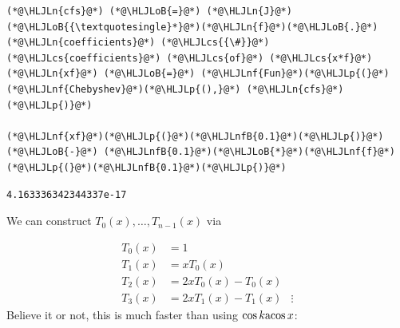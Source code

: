 \documentclass[12pt,a4paper]{article}
\newcommand{\HLJLn}[1]{#1}
\newcommand{\HLJLnf}[1]{\textcolor[RGB]{66,102,213}{#1}}
\newcommand{\HLJLnfB}[1]{\textcolor[RGB]{59,151,46}{#1}}
\newcommand{\HLJLoB}[1]{\textcolor[RGB]{102,102,102}{\textbf{#1}}}
\newcommand{\HLJLp}[1]{#1}
\newcommand{\HLJLcs}[1]{\textcolor[RGB]{153,153,119}{\textit{#1}}}
\def\acos{ {\rm acos}\, }
\begin{document}
\begin{lstlisting}
(*@\HLJLn{cfs}@*) (*@\HLJLoB{=}@*) (*@\HLJLn{J}@*)(*@\HLJLoB{{\textquotesingle}*}@*)(*@\HLJLn{f}@*)(*@\HLJLoB{.}@*)(*@\HLJLn{coefficients}@*) (*@\HLJLcs{{\#}}@*) (*@\HLJLcs{coefficients}@*) (*@\HLJLcs{of}@*) (*@\HLJLcs{x*f}@*)
(*@\HLJLn{xf}@*) (*@\HLJLoB{=}@*) (*@\HLJLnf{Fun}@*)(*@\HLJLp{(}@*)(*@\HLJLnf{Chebyshev}@*)(*@\HLJLp{(),}@*) (*@\HLJLn{cfs}@*)(*@\HLJLp{)}@*)

(*@\HLJLnf{xf}@*)(*@\HLJLp{(}@*)(*@\HLJLnfB{0.1}@*)(*@\HLJLp{)}@*) (*@\HLJLoB{-}@*) (*@\HLJLnfB{0.1}@*)(*@\HLJLoB{*}@*)(*@\HLJLnf{f}@*)(*@\HLJLp{(}@*)(*@\HLJLnfB{0.1}@*)(*@\HLJLp{)}@*)
\end{lstlisting}

\begin{lstlisting}
4.163336342344337e-17
\end{lstlisting}


We can construct $T_0(x),\ldots,T_{n-1}(x)$ via


\begin{align*}
    T_0(x) &= 1\\
    T_1(x) &= x T_0(x) \\
    T_2(x) &= 2x  T_0(x) -  T_0(x) \\    
    T_3(x) &= 2x T_1(x) - T_1(x)
    &\vdots
\end{align*}
Believe it or not, this is much faster than using $\cos k \acos x$:
\end{document}
